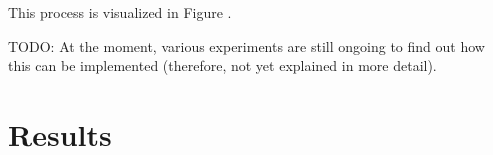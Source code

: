 This process is visualized in Figure . 


TODO: At the moment, various experiments are still ongoing to find out how this can be implemented (therefore, not yet explained in more detail).





\section{Results}












